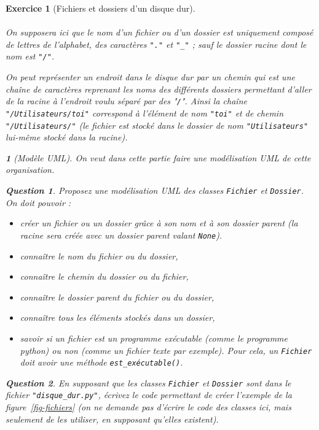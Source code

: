 \documentclass{article}
\theoremstyle{exostyle}
\newtheorem{exo}{Exercice}
\theoremstyle{partiestyle}
\newtheorem{partie}{}[exo]
\theoremstyle{questionstyle}
\newtheorem{questionpartie}{Question}[partie]
\begin{document}
\begin{exo}[Fichiers et dossiers d'un disque dur]
\paragraph{}On supposera ici que le nom d'un fichier ou d'un dossier est uniquement composé de lettres de l'alphabet, des caractères \verb+"."+ et \verb+"_"+ ; sauf le dossier racine dont le nom est \verb`"/"`.

On peut représenter un endroit dans le disque dur par un {\it chemin} qui est une chaîne de caractères reprenant les noms des différents dossiers permettant d'aller de la racine à l'endroit voulu séparé par des "\verb`/`". Ainsi la chaîne \verb`"/Utilisateurs/toi"` correspond à l'élément de nom \verb`"toi"` et de chemin \verb`"/Utilisateurs/"` (le fichier est stocké dans le dossier de nom \verb`"Utilisateurs"` lui-même stocké dans la racine).


\begin{partie}[Modèle UML]
On veut dans cette partie faire une modélisation UML de cette organisation.

\begin{questionpartie}
\label{uml}
Proposez une modélisation UML des classes \verb`Fichier` et \verb`Dossier`. On doit pouvoir :

\begin{itemize}
    \item créer un fichier ou un dossier grâce à son nom et à son dossier parent (la racine sera créée avec un dossier parent valant \verb`None`).
    \item connaître le nom du fichier ou du dossier,
    \item connaître le chemin du dossier ou du fichier,
    \item connaître le dossier parent du fichier ou du dossier,
    \item connaître tous les éléments stockés dans un dossier,
    \item savoir si un fichier est un programme exécutable (comme le programme python) ou non (comme un fichier texte par exemple). Pour cela, un \verb`Fichier` doit avoir une méthode \verb`est_exécutable()`.

\end{itemize}

\end{questionpartie}
\begin{questionpartie}
En supposant que les classes \verb`Fichier` et \verb`Dossier` sont dans le fichier \verb`"disque_dur.py"`, écrivez le code permettant de créer l'exemple de la figure~\ref{fig-fichiers} (on ne demande pas d'écrire le code des classes ici, mais seulement de les utiliser, en supposant qu'elles existent).


\end{questionpartie}
\end{partie}
\end{exo}
\end{document}
